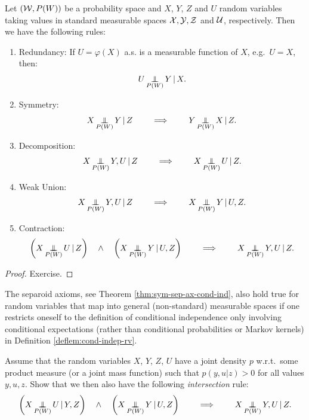 \begin{Thm}
    \label{thm:sym-sep-ax-cond-ind}
  Let $(\mathcal{W},P(W))$ be a probability space and $X$, $Y$, $Z$ and $U$ random variables taking values in standard measurable spaces $\mathcal{X}, \mathcal{Y}, \mathcal{Z}$ and $\mathcal{U}$, respectively.
    Then we have the following rules:
    \begin{enumerate}
        \item Redundancy: If $U= \varphi(X)$ a.s. is a measurable function of $X$, e.g.\ $U=X$, then:
            \[ U \operatorname*{\perp\mkern-11mu\perp}_{P(W)} Y \operatorname*{|} X. \]
        \item Symmetry: 
            \[ X \operatorname*{\perp\mkern-11mu\perp}_{P(W)} Y \operatorname*{|} Z \qquad \implies \qquad Y \operatorname*{\perp\mkern-11mu\perp}_{P(W)} X \operatorname*{|} Z.\]
        \item Decomposition: 
            \[X \operatorname*{\perp\mkern-11mu\perp}_{P(W)} Y,U \operatorname*{|} Z \qquad \implies \qquad X \operatorname*{\perp\mkern-11mu\perp}_{P(W)} U \operatorname*{|} Z.\]
        \item Weak Union:
            \[X \operatorname*{\perp\mkern-11mu\perp}_{P(W)} Y,U \operatorname*{|} Z \qquad \implies \qquad X \operatorname*{\perp\mkern-11mu\perp}_{P(W)} Y \operatorname*{|} U, Z.\]
        \item Contraction:
            \[ \left ( X \operatorname*{\perp\mkern-11mu\perp}_{P(W)} U \operatorname*{|} Z  \right ) \quad \land \quad \left ( X \operatorname*{\perp\mkern-11mu\perp}_{P(W)} Y \operatorname*{|} U,Z  \right ) \qquad \implies \qquad X \operatorname*{\perp\mkern-11mu\perp}_{P(W)} Y,U \operatorname*{|} Z.  \]
    \end{enumerate}
    \begin{proof}
        Exercise. 
    \end{proof}
\end{Thm}

\begin{Rem}
    The separoid axioms, see Theorem \ref{thm:sym-sep-ax-cond-ind}, also hold true for random variables that map into general (non-standard) measurable spaces if 
    one restricts oneself to the definition of conditional independence only involving conditional expectations (rather than conditional probabilities or Markov kernels) in Definition \ref{deflem:cond-indep-rv}.
\end{Rem}

\begin{Exc}
    Assume that the random variables $X$, $Y$, $Z$, $U$ have a joint density $p$ w.r.t.\ some product measure (or a joint mass function)
    such that $p(y,u|z) > 0$ for all values $y,u,z$. Show that we then also have the following \emph{intersection} rule:
            \[ \left ( X \operatorname*{\perp\mkern-11mu\perp}_{P(W)} U \operatorname*{|} Y,Z  \right ) \quad \land \quad \left ( X \operatorname*{\perp\mkern-11mu\perp}_{P(W)} Y \operatorname*{|} U,Z  \right ) \qquad \implies \qquad X \operatorname*{\perp\mkern-11mu\perp}_{P(W)} Y,U \operatorname*{|} Z.  \]

\end{Exc}


